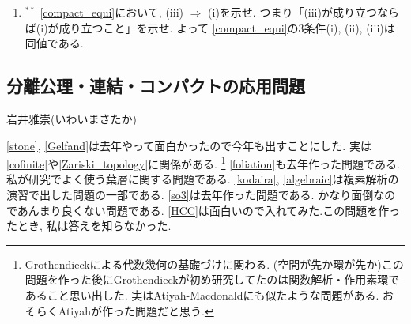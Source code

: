 \documentclass[dvipdfmx,a4paper,11pt]{article}
\theoremstyle{definition}
\begin{document}
\begin{enumerate}[label=\textbf{問}\ref*{sec-compact}.\arabic*]
\item $^{**}$ \ref{compact_equi}において, (iii) $\Rightarrow$ (i)を示せ. つまり「(iii)が成り立つならば(i)が成り立つこと」を示せ. よって \ref{compact_equi}の3条件(i), (ii), (iii)は同値である.


 \end{enumerate}




\newpage




	
	



\begin{center}
\section{分離公理・連結・コンパクトの応用問題}
\label{sec-compact_continue}
\end{center}

\begin{flushright}
 岩井雅崇(いわいまさたか)
\end{flushright}



\ref{stone}, \ref{Gelfand}は去年やって面白かったので今年も出すことにした. 実は\ref{cofinite}や\ref{Zariski_topology}に関係がある. \footnote{Grothendieckによる代数幾何の基礎づけに関わる. (空間が先か環が先か)この問題を作った後にGrothendieckが初め研究してたのは関数解析・作用素環であること思い出した. 実はAtiyah-Macdonaldにも似たような問題がある. おそらくAtiyahが作った問題だと思う.} \ref{foliation}も去年作った問題である. 私が研究でよく使う葉層に関する問題である.
 \ref{kodaira}, \ref{algebraic}は複素解析の演習で出した問題の一部である. %
 \ref{so3}は去年作った問題である. かなり面倒なのであんまり良くない問題である. \ref{HCC}は面白いので入れてみた.この問題を作ったとき, 私は答えを知らなかった. 
\end{document}
